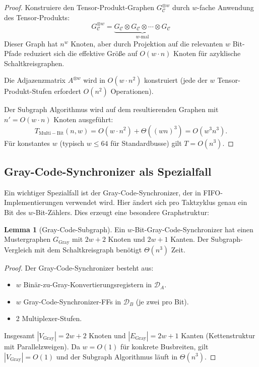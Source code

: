 ﻿\documentclass[a4paper,12pt]{article}
\theoremstyle{definition}
\newtheorem{lemma}{Lemma}
\begin{document}
	\begin{proof}
		Konstruiere den Tensor-Produkt-Graphen $G_{\mathcal{C}}^{\otimes w}$ durch
		$w$-fache Anwendung des Tensor-Produkts:
		\[
		G_{\mathcal{C}}^{\otimes w} = \underbrace{G_{\mathcal{C}} \otimes G_{\mathcal{C}}
			\otimes \cdots \otimes G_{\mathcal{C}}}_{w\text{-mal}}
		\]
		Dieser Graph hat $n^w$ Knoten, aber durch Projektion auf die relevan\-ten
		$w$ Bit-Pfade reduziert sich die effektive Gr\"o\ss{}e auf $O(w \cdot n)$ Knoten
		f\"ur azyklische Schaltkreisgraphen.
		
		Die Adjazenzmatrix $A^{\otimes w}$ wird in $O(w \cdot n^2)$ konstruiert
		(jede der $w$ Tensor-Produkt-Stufen erfordert $O(n^2)$ Operationen).
		
		Der Subgraph Algorithmus wird auf dem resultierenden Graphen
		mit $n' = O(w \cdot n)$ Knoten ausgef\"uhrt:
		\[
		T_{\mathrm{Multi-Bit}}(n, w) = O(w \cdot n^2) + \Theta((wn)^3)
		= O(w^3 n^3).
		\]
		F\"ur konstantes $w$ (typisch $w \leq 64$ f\"ur Standardbusse) gilt
		$T = O(n^3)$. \qedhere
	\end{proof}
	
	\subsection{Gray-Code-Synchronizer als Spezialfall}
	
	Ein wichtiger Spezialfall ist der Gray-Code-Synchronizer, der in
	FIFO-Implementierungen verwendet wird. Hier \"andert sich pro Taktzyklus
	genau ein Bit des $w$-Bit-Z\"ahlers. Dies erzeugt eine besondere
	Graphstruktur:
	
	\begin{lemma}[Gray-Code-Subgraph]
		\label{lem:graycode}
		Ein $w$-Bit-Gray-Code-Synchronizer hat einen Mustergraphen $G_{\mathrm{Gray}}$
		mit $2w + 2$ Knoten und $2w + 1$ Kanten. Der Subgraph-Vergleich
		mit dem Schaltkreisgraph ben\"otigt $\Theta(n^3)$ Zeit.
	\end{lemma}
	
	\begin{proof}
		Der Gray-Code-Synchronizer besteht aus:
		\begin{itemize}
			\item $w$ Bin\"ar-zu-Gray-Konvertierungsregistern in $\mathcal{D}_A$.
			\item $w$ Gray-Code-Synchronizer-FFs in $\mathcal{D}_B$ (je zwei pro Bit).
			\item 2 Multiplexer-Stufen.
		\end{itemize}
		Insgesamt $|V_{\mathrm{Gray}}| = 2w + 2$ Knoten und $|E_{\mathrm{Gray}}| = 2w + 1$
		Kanten (Kettenstruktur mit Parallelzweigen). Da $w = O(1)$ f\"ur konkrete
		Busbreiten, gilt $|V_{\mathrm{Gray}}| = O(1)$ und der Subgraph Algorithmus
		l\"auft in $\Theta(n^3)$. \qedhere
	\end{proof}
	
\end{document}
